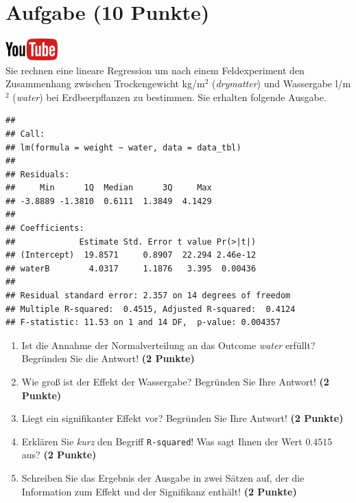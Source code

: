 \documentclass[a4paper, 9pt]{scrartcl}\usepackage[]{graphicx}\usepackage[]{xcolor}
\makeatletter
\newenvironment{kframe}{%
 \def\at@end@of@kframe{}%
 \ifinner\ifhmode%
  \def\at@end@of@kframe{\end{minipage}}%
  \begin{minipage}{\columnwidth}%
 \fi\fi%
 \def\FrameCommand##1{\hskip\@totalleftmargin \hskip-\fboxsep
 \colorbox{shadecolor}{##1}\hskip-\fboxsep
     \hskip-\linewidth \hskip-\@totalleftmargin \hskip\columnwidth}%
 \MakeFramed {\advance\hsize-\width
   \@totalleftmargin\z@ \linewidth\hsize
   \@setminipage}}%
 {\par\unskip\endMakeFramed%
 \at@end@of@kframe}
\newenvironment{knitrout}{}{} %
\makeatother
\begin{document}
\section{Aufgabe \hfill (10 Punkte)}

\hfill\href{https://youtu.be/tNNzcndrpSk}{\includegraphics[width =
  2cm]{img/youtube}}\\[1Ex]

Sie rechnen eine lineare Regression um nach einem Feldexperiment den
Zusammenhang zwischen Trockengewicht kg/m$^2$ (\textit{drymatter}) und
Wassergabe l/m$^2$ (\textit{water}) bei Erdbeerpflanzen zu bestimmen. Sie
erhalten folgende \Rlogo Ausgabe.

\begin{knitrout}
\color{fgcolor}\begin{kframe}
\begin{verbatim}
## 
## Call:
## lm(formula = weight ~ water, data = data_tbl)
## 
## Residuals:
##     Min      1Q  Median      3Q     Max 
## -3.8889 -1.3810  0.6111  1.3849  4.1429 
## 
## Coefficients:
##             Estimate Std. Error t value Pr(>|t|)
## (Intercept)  19.8571     0.8907  22.294 2.46e-12
## waterB        4.0317     1.1876   3.395  0.00436
## 
## Residual standard error: 2.357 on 14 degrees of freedom
## Multiple R-squared:  0.4515,	Adjusted R-squared:  0.4124 
## F-statistic: 11.53 on 1 and 14 DF,  p-value: 0.004357
\end{verbatim}
\end{kframe}
\end{knitrout}


\begin{enumerate}
\item Ist die Annahme der Normalverteilung an das Outcome \textit{water}
  erf{\"u}llt?  Begr{\"u}nden Sie die Antwort! \textbf{(2 Punkte)}
\item Wie gro{\ss} ist der Effekt der Wassergabe?  Begr{\"u}nden Sie Ihre Antwort! \textbf{(2 Punkte)} 
\item Liegt ein signifikanter
  Effekt vor? Begr{\"u}nden Sie Ihre Antwort! \textbf{(2 Punkte)}
\item Erkl{\"a}ren Sie \textit{kurz} den Begriff \texttt{R-squared}!
  Was sagt Ihnen der Wert $0.4515$ aus? \textbf{(2 Punkte)}
\item Schreiben Sie das Ergebnis der \Rlogo Ausgabe in zwei S{\"a}tzen auf, der die
  Information zum Effekt und der Signifikanz enth{\"a}lt! \textbf{(2 Punkte)} 
\end{enumerate}
 
\end{document}
